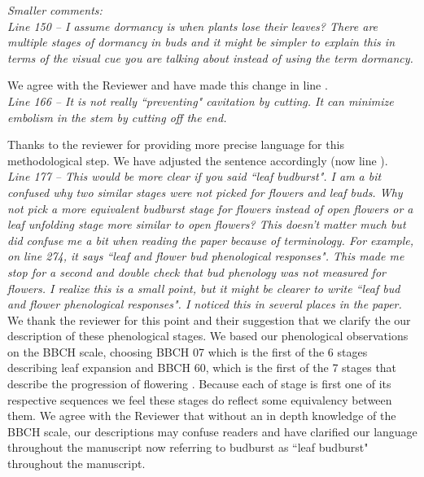 \documentclass[11pt]{article}
\begin{document}
\emph{Smaller comments:}\\

\emph{Line 150 – I assume dormancy is when plants lose their leaves? There are multiple stages of dormancy in buds and it might be simpler to explain this in terms of the visual cue you are talking about instead of using the term dormancy.}

We agree with the Reviewer and have made this change in line .\\

\emph{Line 166 – It is not really ``preventing" cavitation by cutting. It can minimize embolism in the stem by cutting off the end.}

Thanks to the reviewer for providing more precise language for this methodological step. We have adjusted the sentence accordingly (now line ).\\


\emph{Line  177 – This would be more clear if you said ``leaf budburst". I am a bit confused why two similar stages were not picked for flowers and leaf buds. Why not pick a more equivalent budburst stage for flowers instead of open flowers or a leaf unfolding stage more similar to open flowers? This doesn’t matter much but did confuse me a bit when reading the paper because of terminology. For example, on line 274, it says ``leaf and flower bud phenological responses". This made me stop for a second and double check that bud phenology was not measured for flowers. I realize this is a small point, but it might be clearer to write ``leaf bud and flower phenological responses". I noticed this in several places in the paper.}\\



We thank the reviewer for this point and their suggestion that we clarify the our description of these phenological stages. We based our phenological observations on the BBCH scale, choosing BBCH 07 which is the first of the 6 stages describing leaf expansion and BBCH 60, which is the first of the 7 stages that describe the progression of flowering \citep{Finn2007}. Because each of stage is first one of its respective sequences we feel these stages do reflect some equivalency between them. %
We agree with the Reviewer that without an in depth knowledge of the BBCH scale, our descriptions may confuse readers and have clarified our language throughout the manuscript now referring to budburst as ``leaf budburst" throughout the manuscript.\\
\end{document}
